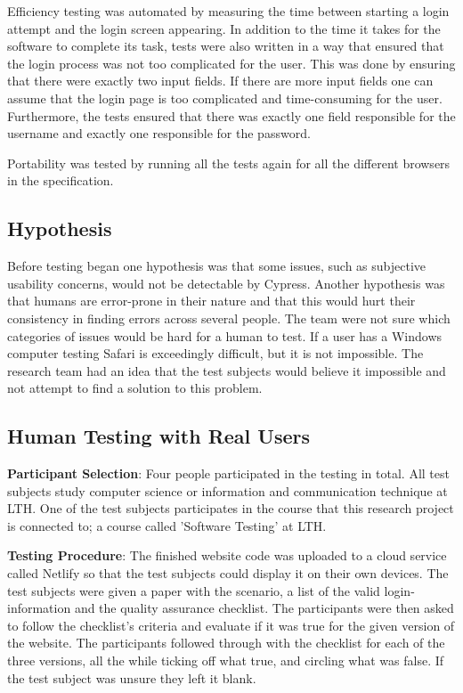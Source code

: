 \documentclass[journal,twocolumn]{IEEEtran}
\begin{document}
Efficiency testing was automated by measuring the time between starting a login attempt and the login screen appearing. In addition to the time it takes for the software to complete its task, tests were also written in a way that ensured that the login process was not too complicated for the user. This was done by ensuring that there were exactly two input fields. If there are more input fields one can assume that the login page is too complicated and time-consuming for the user. Furthermore, the tests ensured that there was exactly one field responsible for the username and exactly one responsible for the password.

Portability was tested by running all the tests again for all the different browsers in the specification.

\subsection{Hypothesis} Before testing began one hypothesis was that some issues, such as subjective usability concerns, would not be detectable by Cypress. Another hypothesis was that humans are error-prone in their nature and that this would hurt their consistency in finding errors across several people. The team were not sure which categories of issues would be hard for a human to test. If a user has a Windows computer testing Safari is exceedingly difficult, but it is not impossible. The research team had an idea that the test subjects would believe it impossible and not attempt to find a solution to this problem.

\subsection{Human Testing with Real Users}
\textbf{Participant Selection}: Four people participated in the testing in total. All test subjects study computer science or information and communication technique at LTH. One of the test subjects participates in the course that this research project is connected to; a course called 'Software Testing' at LTH.

\textbf{Testing Procedure}:
The finished website code was uploaded to a cloud service called Netlify so that the test subjects could display it on their own devices. The test subjects were given a paper with the scenario, a list of the valid login-information and the quality assurance checklist. The participants were then asked to follow the checklist's criteria and evaluate if it was true for the given version of the website. The participants followed through with the checklist for each of the three versions, all the while ticking off what true, and circling what was false. If the test subject was unsure they left it blank.
\end{document}
